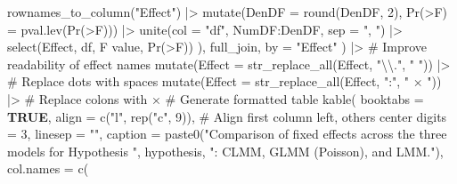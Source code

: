 \documentclass[
  bookmarksnumbered]{article}
\newenvironment{Shaded}{\begin{snugshade}}{\end{snugshade}}
\newcommand{\AttributeTok}[1]{\textcolor[rgb]{0.80,0.80,0.80}{#1}}
\newcommand{\CommentTok}[1]{\textcolor[rgb]{0.50,0.62,0.50}{#1}}
\newcommand{\ConstantTok}[1]{\textcolor[rgb]{0.86,0.64,0.64}{\textbf{#1}}}
\newcommand{\DecValTok}[1]{\textcolor[rgb]{0.86,0.86,0.80}{#1}}
\newcommand{\FunctionTok}[1]{\textcolor[rgb]{0.94,0.94,0.56}{#1}}
\newcommand{\NormalTok}[1]{\textcolor[rgb]{0.80,0.80,0.80}{#1}}
\newcommand{\OtherTok}[1]{\textcolor[rgb]{0.94,0.94,0.56}{#1}}
\newcommand{\SpecialCharTok}[1]{\textcolor[rgb]{0.86,0.64,0.64}{#1}}
\newcommand{\StringTok}[1]{\textcolor[rgb]{0.80,0.58,0.58}{#1}}
\begin{document}
\begin{Shaded}
\begin{Highlighting}[]
          \FunctionTok{rownames\_to\_column}\NormalTok{(}\StringTok{"Effect"}\NormalTok{) }\SpecialCharTok{|\textgreater{}}
          \FunctionTok{mutate}\NormalTok{(}\AttributeTok{DenDF =} \FunctionTok{round}\NormalTok{(DenDF, }\DecValTok{2}\NormalTok{),}
                 \StringTok{\textasciigrave{}}\AttributeTok{Pr(\textgreater{}F)}\StringTok{\textasciigrave{}} \OtherTok{=} \FunctionTok{pval.lev}\NormalTok{(}\StringTok{\textasciigrave{}}\AttributeTok{Pr(\textgreater{}F)}\StringTok{\textasciigrave{}}\NormalTok{)) }\SpecialCharTok{|\textgreater{}}
          \FunctionTok{unite}\NormalTok{(}\AttributeTok{col =} \StringTok{"df"}\NormalTok{, NumDF}\SpecialCharTok{:}\NormalTok{DenDF, }\AttributeTok{sep =} \StringTok{", "}\NormalTok{) }\SpecialCharTok{|\textgreater{}}
          \FunctionTok{select}\NormalTok{(Effect, df, }\StringTok{\textasciigrave{}}\AttributeTok{F value}\StringTok{\textasciigrave{}}\NormalTok{, }\StringTok{\textasciigrave{}}\AttributeTok{Pr(\textgreater{}F)}\StringTok{\textasciigrave{}}\NormalTok{)}
\NormalTok{      ),}
\NormalTok{      full\_join,}
      \AttributeTok{by =} \StringTok{"Effect"}
\NormalTok{    ) }\SpecialCharTok{|\textgreater{}}
    \CommentTok{\# Improve readability of effect names}
    \FunctionTok{mutate}\NormalTok{(}\AttributeTok{Effect =} \FunctionTok{str\_replace\_all}\NormalTok{(Effect, }\StringTok{"}\SpecialCharTok{\textbackslash{}\textbackslash{}}\StringTok{."}\NormalTok{, }\StringTok{" "}\NormalTok{)) }\SpecialCharTok{|\textgreater{}} \CommentTok{\# Replace dots with spaces}
    \FunctionTok{mutate}\NormalTok{(}\AttributeTok{Effect =} \FunctionTok{str\_replace\_all}\NormalTok{(Effect, }\StringTok{":"}\NormalTok{, }\StringTok{" × "}\NormalTok{)) }\SpecialCharTok{|\textgreater{}} \CommentTok{\# Replace colons with ×}
    \CommentTok{\# Generate formatted table}
    \FunctionTok{kable}\NormalTok{(}
      \AttributeTok{booktabs =} \ConstantTok{TRUE}\NormalTok{,}
      \AttributeTok{align =} \FunctionTok{c}\NormalTok{(}\StringTok{"l"}\NormalTok{, }\FunctionTok{rep}\NormalTok{(}\StringTok{"c"}\NormalTok{, }\DecValTok{9}\NormalTok{)), }\CommentTok{\# Align first column left, others center}
      \AttributeTok{digits =} \DecValTok{3}\NormalTok{,}
      \AttributeTok{linesep =} \StringTok{""}\NormalTok{,}
      \AttributeTok{caption =} \FunctionTok{paste0}\NormalTok{(}\StringTok{"Comparison of fixed effects across the three models for Hypothesis "}\NormalTok{, }
\NormalTok{                       hypothesis, }\StringTok{": CLMM, GLMM (Poisson), and LMM."}\NormalTok{),}
      \AttributeTok{col.names =} \FunctionTok{c}\NormalTok{(}

\end{Highlighting}
\end{Shaded}
\end{document}
